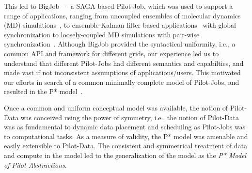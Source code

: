 \documentclass[times]{cpeauth}
\newcommand{\pilotjob}{Pilot-Job\xspace}
\newcommand{\pilotjobs}{Pilot-Jobs\xspace}
\newcommand{\pilotdata}{Pilot-Data\xspace}
\newcommand{\pstar}{P*\xspace}
\begin{document}
This led to BigJob~\cite{saga_bigjob_condor_cloud} -- a SAGA-based
\pilotjob, which was used to support a range of applications, ranging
from uncoupled ensembles of molecular dynamics (MD)
simulations~\cite{saga_bigjob_condor_cloud}, to ensemble-Kalman filter
based applications~\cite{gmac09} with global synchronization to
loosely-coupled MD simulations with pair-wise
synchronization~\cite{async_repex11}.  Although BigJob provided the
syntactical uniformity, i.e., a common API and framework for different
grids, our experience led us to understand that different \pilotjobs
had different semantics and capabilties, and made vast if not
inconsistent assumptions of applications/users. This motivated our
efforts in search of a common minimally complete model of \pilotjobs,
and resulted in the \pstar model~\cite{pstar12}.

Once a common and uniform conceptual model was available, the notion
of \pilotdata was conceived using the power of symmetry, i.e., the
notion of \pilotdata was as fundamental to dynamic data placement and
scheduilng as \pilotjobs was to computational tasks. As a measure of
validity, the \pstar model was amenable and easily extensible to
\pilotdata.  The consistent and symmetrical treatment of data and
compute in the model led to the generalization of the model as the
{\it P* Model of Pilot Abstractions}.

\end{document}

